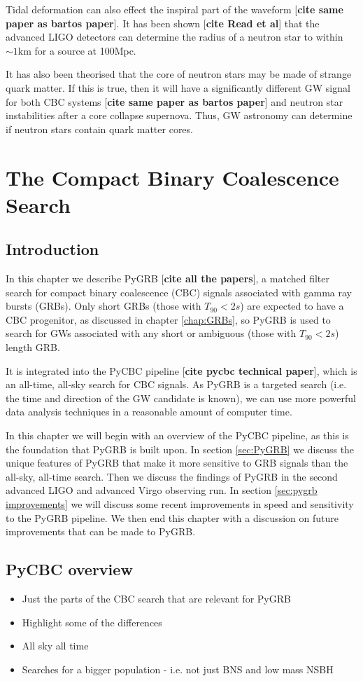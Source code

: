 \documentclass[11pt]{cuthesis}
\begin{document}
Tidal deformation can also effect the inspiral part of the waveform [\textbf{cite same paper as bartos paper}]. It has been shown [\textbf{cite Read et al}] that the advanced LIGO detectors can determine the radius of a neutron star to within $\sim 1$km for a source at 100Mpc. 

It has also been theorised that the core of neutron stars may be made of strange quark matter. If this is true, then it will have a significantly different GW signal for both CBC systems [\textbf{cite same paper as bartos paper}] and neutron star instabilities after a core collapse supernova. Thus, GW astronomy can determine if neutron stars contain quark matter cores. 


\chapter{The Compact Binary Coalescence Search} \label{chap: CBC}
\section{Introduction}\label{CBCintro}
In this chapter we describe PyGRB [\textbf{cite all the papers}], a matched filter search for compact binary coalescence (CBC) signals associated with gamma ray bursts (GRBs). Only short GRBs (those with $T_{90}<2s$) are expected to have a CBC progenitor, as discussed in chapter \ref{chap:GRBs}, so PyGRB is used to search for GWs associated with any short or ambiguous (those with $T_{90}<2s$) length GRB. 

It is integrated into the PyCBC pipeline [\textbf{cite pycbc technical paper}], which is an all-time, all-sky search for CBC signals. As PyGRB is a targeted search (i.e. the time and direction of the GW candidate is known), we can use more powerful data analysis techniques in a reasonable amount of computer time. 

In this chapter we will begin with an overview of the PyCBC pipeline, as this is the foundation that PyGRB is built upon. In section \ref{sec:PyGRB} we discuss the unique features of PyGRB that make it more sensitive to GRB signals than the all-sky, all-time search. Then we discuss the findings of PyGRB in the second advanced LIGO and advanced Virgo observing run. 
In section \ref{sec:pygrb improvements} we will discuss some recent improvements in speed and sensitivity to the PyGRB pipeline. We then end this chapter with a discussion on future improvements that can be made to PyGRB. 

\section{PyCBC overview}
\begin{itemize}
\item Just the parts of the CBC search that are relevant for PyGRB
\item Highlight some of the differences
\item All sky all time
\item Searches for a bigger population - i.e. not just BNS and low mass NSBH
\end{itemize}
\end{document}
